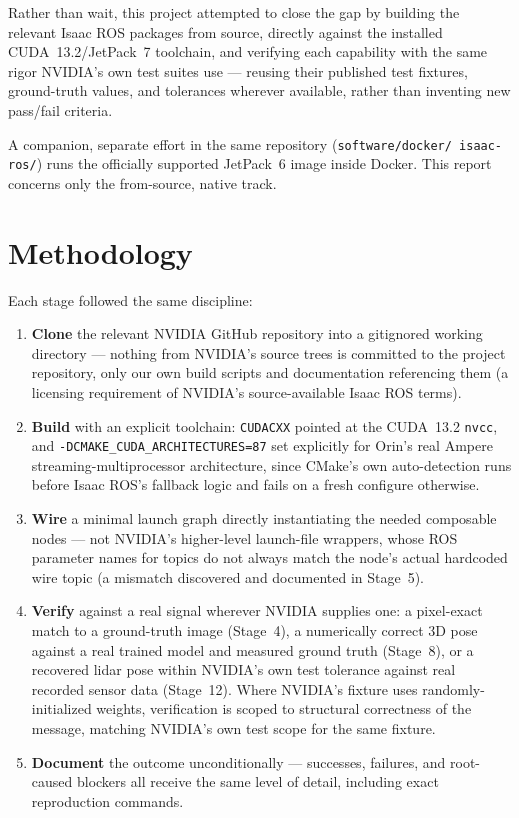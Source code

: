 \documentclass[11pt,a4paper]{article}
\begin{document}
Rather than wait, this project attempted to close the gap by building the
relevant Isaac ROS packages from source, directly against the installed
CUDA~13.2/JetPack~7 toolchain, and verifying each capability with the same
rigor NVIDIA's own test suites use --- reusing their published test fixtures,
ground-truth values, and tolerances wherever available, rather than
inventing new pass/fail criteria.

A companion, separate effort in the same repository (\texttt{software/docker/\allowbreak
isaac-ros/}) runs the officially supported JetPack~6 image inside Docker.
This report concerns only the from-source, native track.

\section{Methodology}

Each stage followed the same discipline:

\begin{enumerate}[leftmargin=1.4cm]
\item \textbf{Clone} the relevant NVIDIA GitHub repository into a
  gitignored working directory --- nothing from NVIDIA's source trees is
  committed to the project repository, only our own build scripts and
  documentation referencing them (a licensing requirement of NVIDIA's
  source-available Isaac ROS terms).
\item \textbf{Build} with an explicit toolchain: \texttt{CUDACXX} pointed
  at the CUDA~13.2 \texttt{nvcc}, and \texttt{-DCMAKE\_CUDA\_ARCHITECTURES=87}
  set explicitly for Orin's real Ampere streaming-multiprocessor
  architecture, since CMake's own auto-detection runs before Isaac ROS's
  fallback logic and fails on a fresh configure otherwise.
\item \textbf{Wire} a minimal launch graph directly instantiating the
  needed composable nodes --- not NVIDIA's higher-level launch-file
  wrappers, whose ROS parameter names for topics do not always match the
  node's actual hardcoded wire topic (a mismatch discovered and documented
  in Stage~5).
\item \textbf{Verify} against a real signal wherever NVIDIA supplies one:
  a pixel-exact match to a ground-truth image (Stage~4), a numerically
  correct 3D pose against a real trained model and measured ground truth
  (Stage~8), or a recovered lidar pose within NVIDIA's own test tolerance
  against real recorded sensor data (Stage~12). Where NVIDIA's fixture uses
  randomly-initialized weights, verification is scoped to structural
  correctness of the message, matching NVIDIA's own test scope for the
  same fixture.
\item \textbf{Document} the outcome unconditionally --- successes,
  failures, and root-caused blockers all receive the same level of
  detail, including exact reproduction commands.
\end{enumerate}
\end{document}
